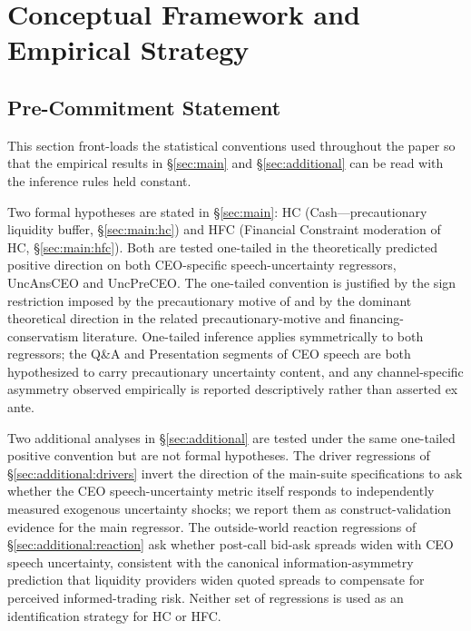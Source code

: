 
\section{Conceptual Framework and Empirical Strategy}
\label{sec:framework}

\subsection{Pre-Commitment Statement}
\label{sec:framework:precommit}

This section front-loads the statistical conventions used throughout the paper so that the empirical results in \S\ref{sec:main} and \S\ref{sec:additional} can be read with the inference rules held constant.

Two formal hypotheses are stated in \S\ref{sec:main}: HC (Cash---precautionary liquidity buffer, \S\ref{sec:main:hc}) and HFC (Financial Constraint moderation of HC, \S\ref{sec:main:hfc}). Both are tested one-tailed in the theoretically predicted positive direction on both CEO-specific speech-uncertainty regressors, UncAnsCEO and UncPreCEO. The one-tailed convention is justified by the sign restriction imposed by the precautionary motive of  and by the dominant theoretical direction in the related precautionary-motive and financing-conservatism literature. One-tailed inference applies symmetrically to both regressors; the Q\&A and Presentation segments of CEO speech are both hypothesized to carry precautionary uncertainty content, and any channel-specific asymmetry observed empirically is reported descriptively rather than asserted ex ante.

Two additional analyses in \S\ref{sec:additional} are tested under the same one-tailed positive convention but are not formal hypotheses. The driver regressions of \S\ref{sec:additional:drivers} invert the direction of the main-suite specifications to ask whether the CEO speech-uncertainty metric itself responds to independently measured exogenous uncertainty shocks; we report them as construct-validation evidence for the main regressor. The outside-world reaction regressions of \S\ref{sec:additional:reaction} ask whether post-call bid-ask spreads widen with CEO speech uncertainty, consistent with the canonical information-asymmetry prediction that liquidity providers widen quoted spreads to compensate for perceived informed-trading risk. Neither set of regressions is used as an identification strategy for HC or HFC.

